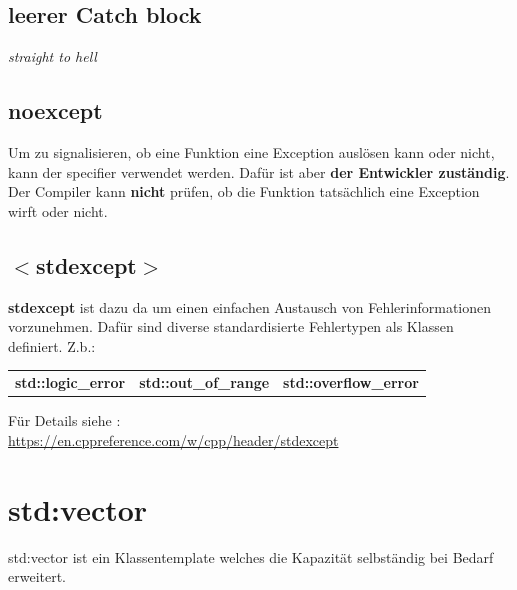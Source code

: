 \subsection{leerer Catch block}

\colorbox{red!50}{\textit{straight to hell}}

\subsection{noexcept}

Um zu signalisieren, ob eine Funktion eine Exception auslösen kann oder nicht, kann der specifier  verwendet werden. 
Dafür ist aber \textbf{der Entwickler zuständig}. 
Der Compiler kann \textbf{nicht} prüfen, ob die Funktion tatsächlich eine Exception wirft oder nicht. 

\subsection{$<$stdexcept$>$}

\textbf{stdexcept} ist dazu da um einen einfachen Austausch von Fehlerinformationen vorzunehmen. 
Dafür sind diverse standardisierte Fehlertypen als Klassen definiert. Z.b.:\\
\begin{tabular}{ccc} \textbf{std::logic\_error} & \textbf{std::out\_of\_range} & \textbf{std::overflow\_error} \end{tabular}
Für Details siehe :\\
\url{https://en.cppreference.com/w/cpp/header/stdexcept}
\section{std:vector}
std:vector ist ein Klassentemplate welches die Kapazität selbständig bei Bedarf erweitert.

